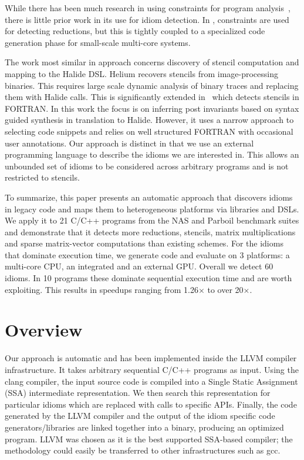     While there has been much research in
    using constraints for program analysis~\cite{nielson2015principles},
    there is little prior work in its use for idiom
    detection. In \cite{ginsbach2017discovery}, constraints are used for
    detecting reductions, but this is tightly coupled to a specialized code
    generation phase for small-scale multi-core systems.

    The work most similar in approach concerns discovery of stencil computation
    and mapping to the Halide DSL.
    Helium \cite{Mendis2015Helium} recovers stencils from image-processing
    binaries.
    This requires large scale dynamic analysis of binary traces and replacing
    them with Halide calls. 
    This is significantly extended in~\cite{Kamil2016Verified} which detects
    stencils in FORTRAN.
    In this work the focus is on inferring post invariants based on syntax
    guided synthesis in translation to Halide.
    However, it uses a narrow approach to selecting code snippets and relies on
    well structured FORTRAN with occasional user annotations.
    Our approach is distinct in that we use an external  programming language to
    describe the idioms we are interested in.
    This allows an unbounded set of idioms  to be considered across arbitrary
    programs and is not restricted to stencils. 

    To summarize, this paper presents an automatic approach that discovers
    idioms in legacy code and maps them to heterogeneous platforms via
    libraries and DSLs.
    We apply it to 21 C/C++ programs from the NAS and Parboil benchmark suites
    and demonstrate that it detects more reductions, stencils, matrix
    multiplications and sparse matrix-vector computations than existing schemes.
    For the idioms that dominate execution time, we generate code and evaluate
    on 3 platforms: a multi-core CPU, an integrated and an external GPU. Overall
    we detect 60 idioms.
    In 10 programs these dominate sequential execution time and are worth
    exploiting.
    This results in speedups ranging from 1.26$\times$ to over 20$\times$.

\section{Overview}

    Our approach is automatic and has been implemented inside the LLVM compiler
    infrastructure.
    It takes arbitrary sequential C/C++ programs as input.
    Using the clang compiler, the input source code is compiled into a Single
    Static Assignment (SSA) intermediate representation.
    We then search this representation for particular idioms which are replaced
    with calls to specific APIs.
    Finally, the code generated by the LLVM compiler and the output of the idiom
    specific code generators/libraries are linked together into a binary,
    producing an optimized program.
    LLVM was chosen as it is the best supported SSA-based compiler;
    the methodology could easily be transferred to other infrastructures such as
    gcc.

